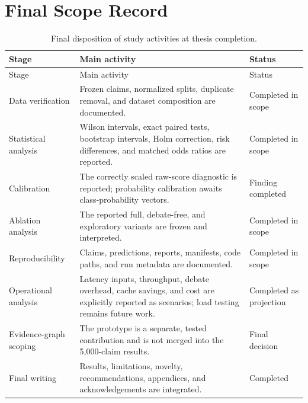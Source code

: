 \documentclass[12pt,a4paper,openany]{report}
\begin{document}
\section{Final Scope Record}
\begin{longtable}{p{3.6cm}p{6.3cm}p{2.6cm}}
\caption{Final disposition of study activities at thesis completion.}\\
\toprule Stage & Main activity & Status \\
\midrule
\endfirsthead
\toprule Stage & Main activity & Status \\
\midrule
\endhead
Data verification & Frozen claims, normalized splits, duplicate removal, and dataset composition are documented. & Completed in scope \\
Statistical analysis & Wilson intervals, exact paired tests, bootstrap intervals, Holm correction, risk differences, and matched odds ratios are reported. & Completed in scope \\
Calibration & The correctly scaled raw-score diagnostic is reported; probability calibration awaits class-probability vectors. & Finding completed \\
Ablation analysis & The reported full, debate-free, and exploratory variants are frozen and interpreted. & Completed in scope \\
Reproducibility & Claims, predictions, reports, manifests, code paths, and run metadata are documented. & Completed in scope \\
Operational analysis & Latency inputs, throughput, debate overhead, cache savings, and cost are explicitly reported as scenarios; load testing remains future work. & Completed as projection \\
Evidence-graph scoping & The prototype is a separate, tested contribution and is not merged into the 5,000-claim results. & Final decision \\
Final writing & Results, limitations, novelty, recommendations, appendices, and acknowledgements are integrated. & Completed \\
\bottomrule
\end{longtable}
\end{document}
